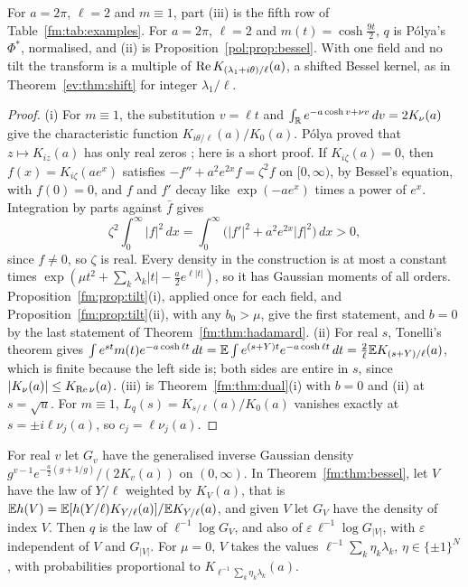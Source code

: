 For $a=2\pi$, $\ell=2$ and $m\equiv1$, part (iii) is the fifth row of Table~\ref{fm:tab:examples}. For $a=2\pi$, $\ell=2$ and $m(t)=\cosh\frac{9t}2$, $q$ is P\'olya's $\Phi^*$, normalised, and (ii) is Proposition~\ref{pol:prop:bessel}. With one field and no tilt the transform is a multiple of $\operatorname{Re} K_{(\lambda_1+i\theta)/\ell}(a)$, a shifted Bessel kernel, as in Theorem~\ref{ev:thm:shift} for integer $\lambda_1/\ell$.

\begin{proof}
(i) For $m\equiv1$, the substitution $v=\ell t$ and $\int_{\mathbb{R}}e^{-a\cosh v+\nu v}\,dv=2K_\nu(a)$ give the characteristic function $K_{i\theta/\ell}(a)/K_0(a)$. P\'olya proved that $z\mapsto K_{iz}(a)$ has only real zeros \cite{Polya}; here is a short proof. If $K_{i\zeta}(a)=0$, then $f(x)=K_{i\zeta}(ae^x)$ satisfies $-f''+a^2e^{2x}f=\zeta^2f$ on $[0,\infty)$, by Bessel's equation, with $f(0)=0$, and $f$ and $f'$ decay like $\exp(-ae^x)$ times a power of $e^x$. Integration by parts against $\bar f$ gives
\[
\zeta^2\int_0^\infty|f|^2\,dx=\int_0^\infty\big(|f'|^2+a^2e^{2x}|f|^2\big)\,dx>0,
\]
since $f\ne0$, so $\zeta$ is real. Every density in the construction is at most a constant times $\exp(\mu t^2+\sum_k\lambda_k|t|-\frac a2e^{\ell|t|})$, so it has Gaussian moments of all orders. Proposition~\ref{fm:prop:tilt}(i), applied once for each field, and Proposition~\ref{fm:prop:tilt}(ii), with any $b_0>\mu$, give the first statement, and $b=0$ by the last statement of Theorem~\ref{fm:thm:hadamard}. (ii) For real $s$, Tonelli's theorem gives $\int e^{st}m(t)e^{-a\cosh\ell t}\,dt=\mathbb{E}\int e^{(s+Y)t}e^{-a\cosh\ell t}\,dt=\frac2\ell\mathbb{E} K_{(s+Y)/\ell}(a)$, which is finite because the left side is; both sides are entire in $s$, since $|K_\nu(a)|\le K_{\operatorname{Re}\nu}(a)$. (iii) is Theorem~\ref{fm:thm:dual}(i) with $b=0$ and (ii) at $s=\sqrt u$. For $m\equiv1$, $L_q(s)=K_{s/\ell}(a)/K_0(a)$ vanishes exactly at $s=\pm i\ell\nu_j(a)$, so $c_j=\ell\nu_j(a)$.
\end{proof}

\begin{proposition}\label{fm:prop:besselgig}
For real $v$ let $G_v$ have the generalised inverse Gaussian density $g^{v-1}e^{-\frac a2(g+1/g)}/(2K_v(a))$ on $(0,\infty)$. In Theorem~\ref{fm:thm:bessel}, let $V$ have the law of $Y/\ell$ weighted by $K_V(a)$, that is $\mathbb{E} h(V)=\mathbb{E}[h(Y/\ell)K_{Y/\ell}(a)]/\mathbb{E} K_{Y/\ell}(a)$, and given $V$ let $G_V$ have the density of index $V$. Then $q$ is the law of $\ell^{-1}\log G_V$, and also of $\varepsilon\,\ell^{-1}\log G_{|V|}$, with $\varepsilon$ independent of $V$ and $G_{|V|}$. For $\mu=0$, $V$ takes the values $\ell^{-1}\sum_k\eta_k\lambda_k$, $\eta\in\{\pm1\}^N$, with probabilities proportional to $K_{\ell^{-1}\sum_k\eta_k\lambda_k}(a)$.
\end{proposition}


